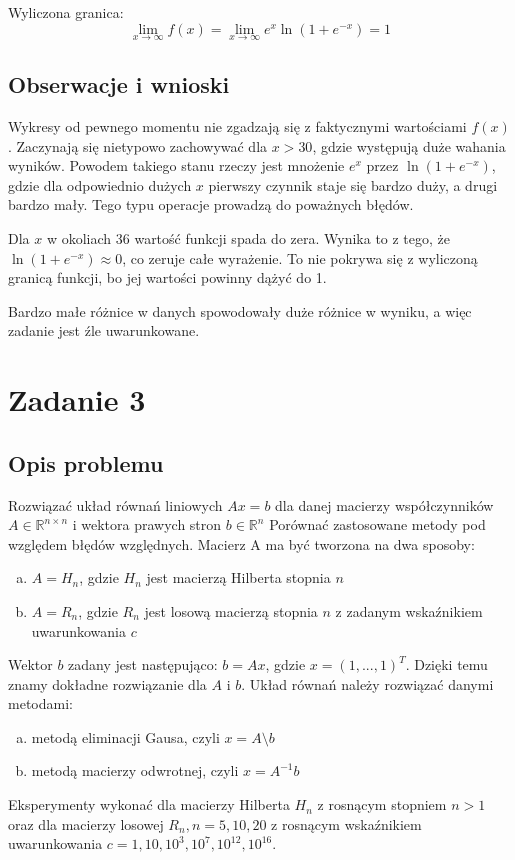 \documentclass{article}
\begin{document}
Wyliczona granica:
$$\lim_{x \to \infty} f(x) = \lim_{x \to \infty} e^{x}\ln(1 + e^{-x}) = 1$$

\subsection{Obserwacje i wnioski}
Wykresy od pewnego momentu nie zgadzają się z faktycznymi wartościami $f(x)$. Zaczynają się nietypowo zachowywać dla
$x > 30$, gdzie występują duże wahania wyników. Powodem takiego stanu rzeczy jest mnożenie $e^{x}$ przez $\ln(1 + e^{-x})$,
gdzie dla odpowiednio dużych $x$ pierwszy czynnik staje się bardzo duży, a drugi bardzo mały. Tego typu operacje
prowadzą do poważnych błędów.

Dla $x$ w okoliach 36 wartość funkcji spada do zera. Wynika to z tego, że $\ln(1 + e^{-x}) \approx 0$, co zeruje całe
wyrażenie. To nie pokrywa się z wyliczoną granicą funkcji, bo jej wartości powinny dążyć do 1.

Bardzo małe różnice w danych spowodowały duże różnice w wyniku, a więc zadanie jest źle uwarunkowane.

\section{Zadanie 3}
\subsection{Opis problemu}
Rozwiązać układ równań liniowych $Ax = b$ dla danej macierzy współczynników $A \in \mathbb{R}^{n \times n}$ i wektora prawych stron
$b \in \mathbb{R}^{n}$ Porównać zastosowane metody pod względem błędów względnych. Macierz A ma być tworzona na dwa sposoby:
\begin{enumerate}[(a)]
    \item $A = H_n$, gdzie $H_n$ jest macierzą Hilberta stopnia $n$
    \item $A = R_n$, gdzie $R_n$ jest losową macierzą stopnia $n$ z zadanym wskaźnikiem uwarunkowania $c$
\end{enumerate}
Wektor $b$ zadany jest następująco: $b = Ax$, gdzie $x = (1, ..., 1)^{T}$. Dzięki temu znamy dokładne rozwiązanie dla
$A$ i $b$.
Układ równań należy rozwiązać danymi metodami:
\begin{enumerate}[(a)]
    \item metodą eliminacji Gausa, czyli $x = A \setminus b$
    \item metodą macierzy odwrotnej, czyli $x = A^{-1}b$
\end{enumerate}
Eksperymenty wykonać dla macierzy Hilberta $H_n$ z rosnącym stopniem $n > 1$ oraz dla macierzy losowej
$R_n, n = 5, 10, 20$ z rosnącym wskaźnikiem uwarunkowania $c = 1, 10, 10^{3}, 10^{7}, 10^{12}, 10^{16}$.
\end{document}
